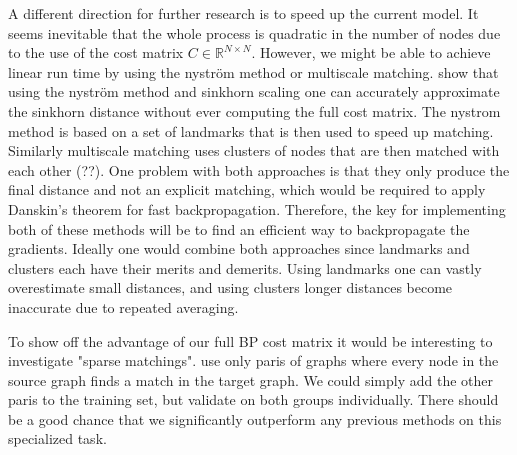 A different direction for further research is to speed up the current model. It seems inevitable that the whole process is quadratic in the number of nodes due to the use of the cost matrix $C \in \mathbb{R}^{N \times N}$. However, we might be able to achieve linear run time by using the nystr{\"{o}}m method or multiscale matching. \cite{nytrom2019} show that using the nystr{\"{o}}m method and sinkhorn scaling one can accurately approximate the sinkhorn distance without ever computing the full cost matrix. The nystrom method is based on a set of landmarks that is then used to speed up matching. Similarly multiscale matching uses clusters of nodes that are then matched with each other (\citealp{}??). One problem with both approaches is that they only produce the final distance and not an explicit matching, which would be required to apply Danskin's theorem for fast backpropagation. Therefore, the key for implementing both of these methods will be to find an efficient way to backpropagate the gradients. Ideally one would combine both approaches since landmarks and clusters each have their merits and demerits. Using landmarks one can vastly overestimate small distances, and using clusters longer distances become inaccurate due to repeated averaging.

To show off the advantage of our full BP cost matrix it would be interesting to investigate "sparse matchings". \cite{fey2020_update} use only paris of graphs where every node in the source graph finds a match in the target graph. We could simply add the other paris to the training set, but validate on both groups individually. There should be a good chance that we significantly outperform any previous methods on this specialized task.

